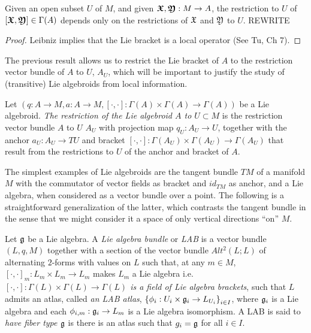 
\begin{proposition}
Given an open subset $U$ of $M$, and given $\bm{\mathfrak{X}}, \bm{\mathfrak{Y}} : M \to A$, the restriction to $U$ of $[\bm{\mathfrak{X}}, \bm{\mathfrak{Y}}] \in \Gamma(A)$ depends only on the restrictions of $\mathfrak{X}$ and $\mathfrak{Y}$ to $U$. REWRITE
\end{proposition}
\begin{proof}
Leibniz implies that the Lie bracket is a local operator (See Tu, Ch 7).
\end{proof}

The previous result allows us to restrict the Lie bracket of $A$ to the restriction vector bundle of $A$ to $U$, $A_U$, which will be important to justify the study of (transitive) Lie algebroids from local information.

\begin{definition}
Let $(q:A \to M, a: A \to M, [\cdot , \cdot]:\Gamma(A)\times \Gamma(A) \to \Gamma(A))$ be a Lie algebroid. \emph{The restriction of the Lie algebroid $A$ to $U \subset M$} is the restriction vector bundle $A$ to $U$ $A_U$ with projection map $q_U: A_U \to U$, together with the anchor $a_U:A_U \to TU$ and bracket $[\cdot , \cdot]:\Gamma(A_U)\times \Gamma(A_U) \to \Gamma(A_U)$ that result from the restrictions to $U$ of the anchor and bracket of $A$.
\end{definition}

The simplest examples of Lie algebroids are the tangent bundle $TM$ of a manifold $M$ with the commutator of vector fields as bracket and $id_{TM}$ as anchor, and a Lie algebra, when considered as a vector bundle over a point. The following is a straightforward generalization of the latter, which contrasts the tangent bundle in the sense that we might consider it a space of only vertical directions ``on'' $M$.

\begin{definition}[LAB]\label{defnLAB}
    Let $\mathfrak{g}$ be a Lie algebra. A \emph{Lie algebra bundle} or \emph{LAB} is a vector bundle $(L, q, M)$ together with a section of the vector bundle $Alt^2(L; L)$ of alternating $2$-forms with values on $L$ such that, at any $m \in M$, $[\cdot, \cdot]_m:L_m \times L_m \to L_m$ makes $L_m$ a Lie algebra i.e. \emph{$[\cdot, \cdot]:\Gamma(L) \times \Gamma(L) \to \Gamma(L)$ is a field of Lie algebra brackets}, such that $L$ admits an atlas, called \emph{an LAB atlas}, $\set{\phi_i: U_i \times \alg g_i \to L_{U_i}}_{i \in I}$, where $\mathfrak{g}_i$ is a Lie algebra and each $\phi_{i, m}: \alg g_i \to L_m$ is a Lie algebra isomorphism. A LAB is said to \emph{have fiber type $\mathfrak{g}$} is there is an atlas such that $g_i = \mathfrak{g}$ for all $i \in I$.
\end{definition}

